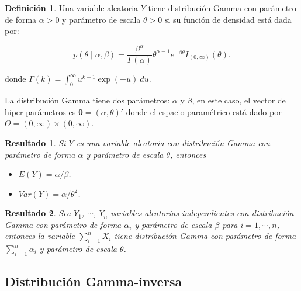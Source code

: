 \documentclass[
  10pt,
  spanish,
]{book}
\providecommand{\tightlist}{%
  \setlength{\itemsep}{0pt}\setlength{\parskip}{0pt}}
\newtheorem{proposition}{Resultado}[chapter]
\theoremstyle{definition}
\newtheorem{definition}{Definición}[chapter]
\theoremstyle{definition}
\theoremstyle{definition}
\theoremstyle{definition}
\theoremstyle{remark}
\begin{document}
\begin{definition}
\protect\hypertarget{def:unnamed-chunk-22}{}{\label{def:unnamed-chunk-22} }Una variable aleatoria \(Y\) tiene distribución Gamma con parámetro de forma \(\alpha>0\) y parámetro de escala \(\theta>0\) si su función de densidad está dada por:

\begin{equation}
p(\theta \mid \alpha,\beta)=\frac{\beta^\alpha}{\Gamma(\alpha)}\theta^{\alpha-1} e^{-\beta\theta}I_{(0,\infty)}(\theta).
\end{equation}

donde \(\Gamma(k)=\int_0^{\infty}u^{k-1}\exp(-u)\ du\).
\end{definition}

La distribución Gamma tiene dos parámetros: \(\alpha\) y \(\beta\), en este caso, el vector de hiper-parámetros es \(\boldsymbol \theta=(\alpha,\theta)'\) donde el espacio paramétrico está dado por \(\Theta=(0,\infty)\times(0,\infty)\).

\begin{proposition}
\protect\hypertarget{prp:unnamed-chunk-23}{}{\label{prp:unnamed-chunk-23} }Si \(Y\) es una variable aleatoria con distribución Gamma con parámetro de forma \(\alpha\) y parámetro de escala \(\theta\), entonces

\begin{itemize}
\tightlist
\item
  \(E(Y)=\alpha/\beta\).
\item
  \(Var(Y)=\alpha/\theta^2\).
\end{itemize}
\end{proposition}

\begin{proposition}
\protect\hypertarget{prp:unnamed-chunk-24}{}{\label{prp:unnamed-chunk-24} }Sea \(Y_1\), \(\cdots\), \(Y_n\) variables aleatorias independientes con distribución Gamma con parámetro de forma \(\alpha_i\) y parámetro de escala \(\beta\) para \(i=1,\cdots,n\), entonces la variable \(\sum_{i=1}^nX_i\) tiene distribución Gamma con parámetro de forma \(\sum_{i=1}^n\alpha_i\) y parámetro de escala \(\theta\).
\end{proposition}

\hypertarget{distribuciuxf3n-gamma-inversa}{%
\subsection{Distribución Gamma-inversa}\label{distribuciuxf3n-gamma-inversa}}
\end{document}
